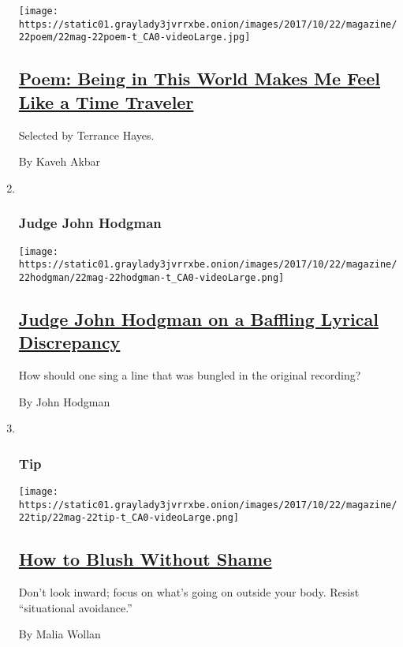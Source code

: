 \begin{enumerate}
  \texttt{[image: https://static01.graylady3jvrrxbe.onion/images/2017/10/22/magazine/22poem/22mag-22poem-t\_CA0-videoLarge.jpg]}

  \hypertarget{poem-being-in-this-world-makes-me-feel-like-a-time-traveler}{%
  \subsection{\texorpdfstring{\href{/2017/10/20/magazine/poem-being-in-this-world-makes-me-feel-like-a-time-traveler.html}{Poem:
  Being in This World Makes Me Feel Like a Time
  Traveler}}{Poem: Being in This World Makes Me Feel Like a Time Traveler}}\label{poem-being-in-this-world-makes-me-feel-like-a-time-traveler}}

  Selected by Terrance Hayes.

  By Kaveh Akbar
\item ~
  \hypertarget{judge-john-hodgman}{%
  \subsubsection{Judge John Hodgman}\label{judge-john-hodgman}}

  \texttt{[image: https://static01.graylady3jvrrxbe.onion/images/2017/10/22/magazine/22hodgman/22mag-22hodgman-t\_CA0-videoLarge.png]}

  \hypertarget{judge-john-hodgman-on-a-baffling-lyrical-discrepancy}{%
  \subsection{\texorpdfstring{\href{/2017/10/20/magazine/judge-john-hodgman-on-a-baffling-lyrical-discrepancy.html}{Judge
  John Hodgman on a Baffling Lyrical
  Discrepancy}}{Judge John Hodgman on a Baffling Lyrical Discrepancy}}\label{judge-john-hodgman-on-a-baffling-lyrical-discrepancy}}

  How should one sing a line that was bungled in the original recording?

  By John Hodgman
\item ~
  \hypertarget{tip}{%
  \subsubsection{Tip}\label{tip}}

  \texttt{[image: https://static01.graylady3jvrrxbe.onion/images/2017/10/22/magazine/22tip/22mag-22tip-t\_CA0-videoLarge.png]}

  \hypertarget{how-to-blush-without-shame}{%
  \subsection{\texorpdfstring{\href{/2017/10/20/magazine/how-to-blush-without-shame.html}{How
  to Blush Without
  Shame}}{How to Blush Without Shame}}\label{how-to-blush-without-shame}}

  Don't look inward; focus on what's going on outside your body. Resist
  ``situational avoidance.''

  By Malia Wollan
\end{enumerate}

